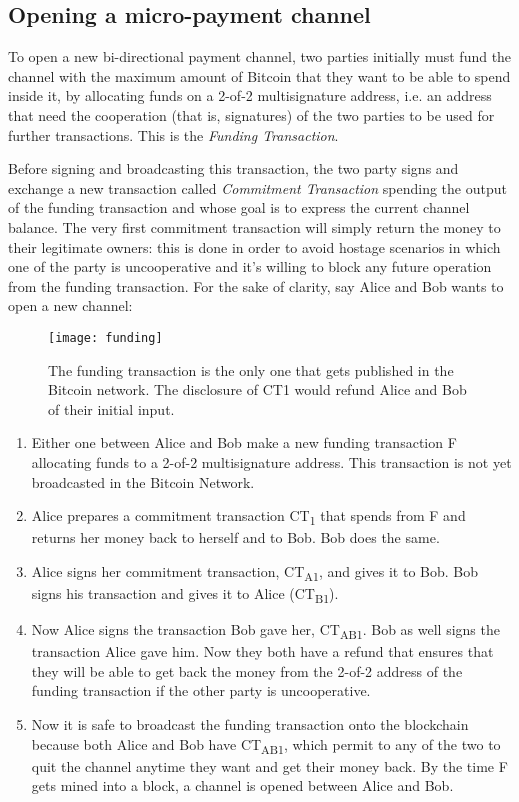 		\subsection{Opening a micro-payment channel}
		
		To open a new bi-directional payment channel, two parties initially must fund the channel with the maximum amount of Bitcoin that they want to be able to spend inside it, by allocating funds on a 2-of-2 multisignature address, i.e. an address that need the cooperation (that is, signatures) of the two parties to be used for further transactions. This is the \textit{Funding Transaction}.
		
		Before signing and broadcasting this transaction, the two party signs and exchange a new transaction called \textit{Commitment Transaction} spending the output of the funding transaction and whose goal is to express the current channel balance. The very first commitment transaction will simply return the money to their legitimate owners: this is done in order to avoid hostage scenarios in which one of the party is uncooperative and it's willing to block any future operation from the funding transaction. For the sake of clarity, say Alice and Bob wants to open a new channel:
		
		\begin{figure}[]
			\texttt{[image: funding]}
			\centering
			\caption{The funding transaction is the only one that gets published in the Bitcoin network. The disclosure of CT1 would refund Alice and Bob of their initial input.}
		\end{figure}
		
		\begin{enumerate}
			\item Either one between Alice and Bob make a new funding transaction F allocating funds to a 2-of-2 multisignature address. This transaction is not yet broadcasted in the Bitcoin Network.
			
			\item Alice prepares a commitment transaction CT\textsubscript{1} that spends from F and returns her money back to herself and to Bob. Bob does the same.
			
			\item Alice signs her commitment transaction, CT\textsubscript{A1}, and gives it to Bob. Bob signs his transaction and gives it to Alice (CT\textsubscript{B1}). 
			
			\item Now Alice signs the transaction Bob gave her, CT\textsubscript{AB1}. Bob as well signs the transaction Alice gave him. Now they both have a refund that ensures that they will be able to get back the money from the 2-of-2 address of the funding transaction if the other party is uncooperative.
			
			\item Now it is safe to broadcast the funding transaction onto the blockchain because both Alice and Bob have CT\textsubscript{AB1}, which permit to any of the two to quit the channel anytime they want and get their money back. By the time F gets mined into a block, a channel is opened between Alice and Bob.
		\end{enumerate}
		
